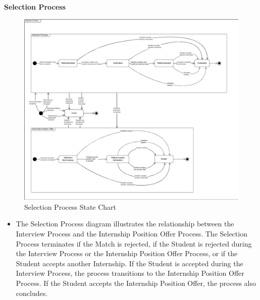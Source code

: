 \noindent\textbf{\color{titleColor}Selection Process}\\
\begin{figure}[H]
    \centering
    \includegraphics[width=1 \textwidth]{Latex/Images/RASD/StateCharts/SelectionProcessStateChart.png}
    \caption{Selection Process State Chart}
    \label{fig:SelectionProcess}
\end{figure}
\begin{itemize}
    \item The Selection Process diagram illustrates the relationship between the Interview Process and the Internship Position Offer Process.
    The Selection Process terminates if the Match is rejected, if the Student is rejected during the Interview Process or the Internship Position Offer Process, or if the Student accepts another Internship.
    If the Student is accepted during the Interview Process, the process transitions to the Internship Position Offer Process.
    If the Student accepts the Internship Position Offer, the process also concludes.
\end{itemize}
\clearpage
